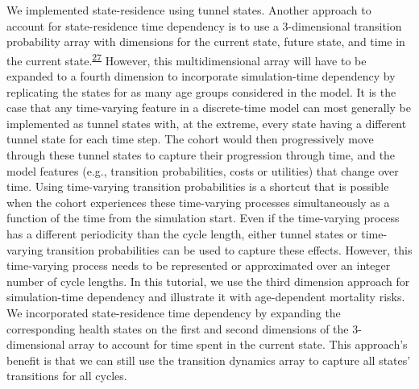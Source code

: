 \documentclass[
]{article}
\begin{document}
We implemented state-residence using tunnel states. Another approach to account for state-residence time dependency is to use a 3-dimensional transition probability array with dimensions for the current state, future state, and time in the current state.\textsuperscript{\protect\hyperlink{ref-Hawkins2005}{27}} However, this multidimensional array will have to be expanded to a fourth dimension to incorporate simulation-time dependency by replicating the states for as many age groups considered in the model. It is the case that any time-varying feature in a discrete-time model can most generally be implemented as tunnel states with, at the extreme, every state having a different tunnel state for each time step. The cohort would then progressively move through these tunnel states to capture their progression through time, and the model features (e.g., transition probabilities, costs or utilities) that change over time. Using time-varying transition probabilities is a shortcut that is possible when the cohort experiences these time-varying processes simultaneously as a function of the time from the simulation start. Even if the time-varying process has a different periodicity than the cycle length, either tunnel states or time-varying transition probabilities can be used to capture these effects. However, this time-varying process needs to be represented or approximated over an integer number of cycle lengths. In this tutorial, we use the third dimension approach for simulation-time dependency and illustrate it with age-dependent mortality risks. We incorporated state-residence time dependency by expanding the corresponding health states on the first and second dimensions of the 3-dimensional array to account for time spent in the current state. This approach's benefit is that we can still use the transition dynamics array to capture all states' transitions for all cycles.
\end{document}
